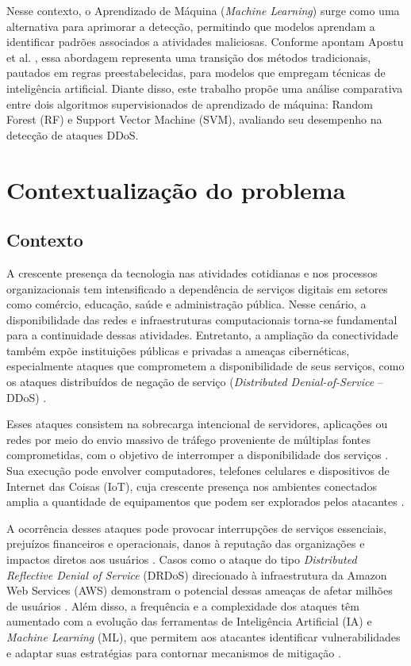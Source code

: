 \documentclass[
    12pt,                %
    openright,           %
    oneside,             %
    a4paper,             %
    english,             %
    brazil               %
]{abntex2}
\begin{document}
Nesse contexto, o Aprendizado de Máquina (\textit{Machine Learning}) surge como uma alternativa para aprimorar a detecção, permitindo que modelos aprendam a identificar padrões associados a atividades maliciosas. Conforme apontam Apostu et al. \cite{apostu2026}, essa abordagem representa uma transição dos métodos tradicionais, pautados em regras preestabelecidas, para modelos que empregam técnicas de inteligência artificial. Diante disso, este trabalho propõe uma análise comparativa entre dois algoritmos supervisionados de aprendizado de máquina: Random Forest (RF) e Support Vector Machine (SVM), avaliando seu desempenho na detecção de ataques DDoS.

\section{Contextualização do problema}
\label{sec:contexto}

\subsection{Contexto}

A crescente presença da tecnologia nas atividades cotidianas e nos processos organizacionais tem intensificado a dependência de serviços digitais em setores como comércio, educação, saúde e administração pública. Nesse cenário, a disponibilidade das redes e infraestruturas computacionais torna-se fundamental para a continuidade dessas atividades. Entretanto, a ampliação da conectividade também expõe instituições públicas e privadas a ameaças cibernéticas, especialmente ataques que comprometem a disponibilidade de seus serviços, como os ataques distribuídos de negação de serviço (\textit{Distributed Denial-of-Service} -- DDoS) \cite{ouhssini2024,thaqi2026}.

Esses ataques consistem na sobrecarga intencional de servidores, aplicações ou redes por meio do envio massivo de tráfego proveniente de múltiplas fontes comprometidas, com o objetivo de interromper a disponibilidade dos serviços \cite{ibm2026}. Sua execução pode envolver computadores, telefones celulares e dispositivos de Internet das Coisas (IoT), cuja crescente presença nos ambientes conectados amplia a quantidade de equipamentos que podem ser explorados pelos atacantes \cite{ibm2026}.

A ocorrência desses ataques pode provocar interrupções de serviços essenciais, prejuízos financeiros e operacionais, danos à reputação das organizações e impactos diretos aos usuários \cite{ouhssini2024}. Casos como o ataque do tipo \textit{Distributed Reflective Denial of Service} (DRDoS) direcionado à infraestrutura da Amazon Web Services (AWS) demonstram o potencial dessas ameaças de afetar milhões de usuários \cite{subramani2021}. Além disso, a frequência e a complexidade dos ataques têm aumentado com a evolução das ferramentas de Inteligência Artificial (IA) e \textit{Machine Learning} (ML), que permitem aos atacantes identificar vulnerabilidades e adaptar suas estratégias para contornar mecanismos de mitigação \cite{ibm2026,thaqi2026}.
\end{document}
